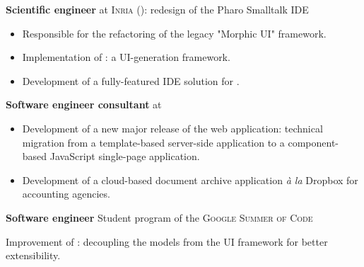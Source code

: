 \begin{rubric}{
}
\textbf{Scientific engineer} at \textsc{Inria} (): redesign of the Pharo
Smalltalk IDE

\begin{itemize}
    \item Responsible for the refactoring of the legacy "Morphic UI" framework.
    \item Implementation of : a UI-generation framework.
    \item Development of a fully-featured IDE solution for .
\end{itemize}





 \textbf{Software engineer consultant} at 

\begin{itemize}
\item Development of a new major release of the web
  application: technical migration from a template-based server-side application to a component-based JavaScript single-page application.
\item Development of a cloud-based document archive application \emph{à la} Dropbox for
  accounting agencies.
\end{itemize}

 \textbf{Software engineer} Student program of the \textsc{Google Summer of Code}

\medskip

Improvement of : decoupling the models from the UI framework for better extensibility.


\end{rubric}
